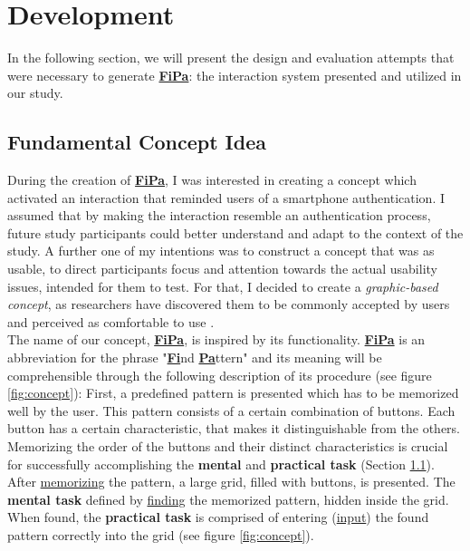 \section{Development} \label{4.2}

In the following section, we will present the design and evaluation attempts that were necessary to generate \underline{\textbf{FiPa}}: the interaction system presented and utilized in our study. 

\subsection{Fundamental Concept Idea} \label{4.2.1}

During the creation of \underline{\textbf{FiPa}}, I was interested in creating a concept which activated an interaction that reminded users of a smartphone authentication. I assumed that by making the interaction resemble an authentication process, future study participants could better understand and adapt to the context of the study. A further one of my intentions was to construct a concept that was as usable, to direct participants focus and attention towards the actual usability issues, intended for them to test. For that, I decided to create a \textit{graphic-based concept}, as researchers have discovered them to be commonly accepted by users and perceived as comfortable to use \cite{PatternWild}. \\ 

The name of our concept, \underline{\textbf{FiPa}}, is inspired by its functionality. \underline{\textbf{FiPa}} is an abbreviation for the phrase "\underline{\textbf{Fi}}nd \underline{\textbf{Pa}}ttern" and its meaning will be comprehensible through the following description of its procedure (see figure \ref{fig:concept}): First, a predefined pattern is presented which has to be memorized well by the user. This pattern consists of a certain combination of buttons. Each button has a certain characteristic, that makes it distinguishable from the others. Memorizing the order of the buttons and their distinct characteristics is crucial for successfully accomplishing the \textbf{mental} and \textbf{practical task} (Section \ref{4.2.1}). After \underline{memorizing} the pattern, a large grid, filled with buttons, is presented. The \textbf{mental task} defined by \underline{finding} the memorized pattern, hidden inside the grid. When found, the \textbf{practical task} is comprised of entering  (\underline{input}) the found pattern correctly into the grid (see figure \ref{fig:concept}).\\

